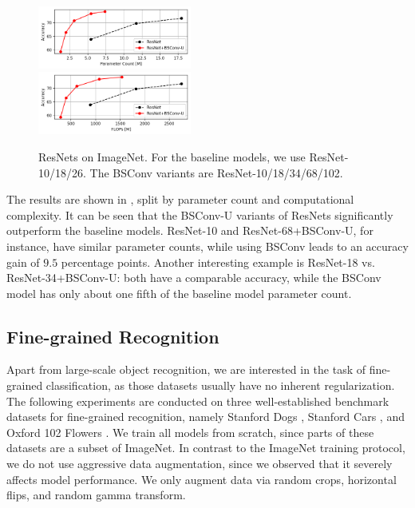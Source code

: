 \documentclass[10pt,twocolumn,letterpaper]{article}
\newcommand{\DCCK}{BSConv\xspace}
\newcommand{\DCCKU}{\DCCK-U\xspace}
\begin{document}
\begin{figure}
	\center
	\includegraphics[width=0.45\textwidth]{images/resnets-imagenet-params.png}~~~~~~~~
	\includegraphics[width=0.45\textwidth]{images/resnets-imagenet-flops.png}
	\caption{%
		ResNets on ImageNet.
		For the baseline models, we use ResNet-10/18/26.
		The \DCCK variants are ResNet-10/18/34/68/102.
	}
     \label{fig:resnetsImagenetParamsAndFlops}
\end{figure}

The results are shown in , split by parameter count and computational complexity.
It can be seen that the \DCCKU variants of ResNets significantly outperform the baseline models.
ResNet-10 and \mbox{ResNet-68+\DCCKU}, for instance, have similar parameter counts, while using \DCCK leads to an accuracy gain of $9.5$ percentage points.
Another interesting example is ResNet-18 vs. \mbox{ResNet-34+\DCCKU}: both have a comparable accuracy, while the \DCCK model has only about one fifth of the baseline model parameter count.

\subsection{Fine-grained Recognition}
Apart from large-scale object recognition, we are interested in the task of fine-grained classification, as those datasets usually have no inherent regularization.
The following experiments are conducted on three well-established benchmark datasets for fine-grained recognition, namely Stanford Dogs \cite{Khosla2011dogs}, Stanford Cars \cite{KrauseStarkDengFei-Fei_3DRR2013}, and Oxford 102 Flowers \cite{nilsback2008automated}.
We train all models from scratch, since parts of these datasets are a subset of ImageNet.
In contrast to the ImageNet training protocol, we do not use aggressive data augmentation, since we observed that it severely affects model performance.
We only augment data via random crops, horizontal flips, and random gamma transform.
\end{document}
